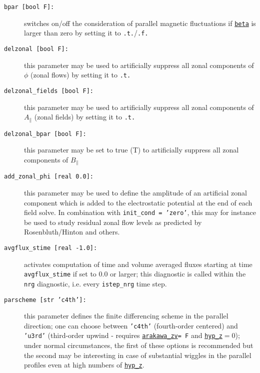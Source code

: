 \documentclass[12pt]{article}
\begin{document}
\begin{description}
\item[\hypertarget{bpar}{\tt bpar [bool F]:}] switches on/off the consideration of parallel magnetic fluctuations if
  \hyperlink{beta}{\tt beta} is larger than zero by setting it to \texttt{.t.}/\texttt{.f.}
\item[\texttt{delzonal [bool F]:}] this parameter may be used to
artificially suppress all zonal components of $\phi$ (zonal flows)
  by setting it to \texttt{.t.}
\item[\texttt{delzonal\_fields [bool F]:}] this parameter may be used to
artificially suppress all zonal components of $A_{\parallel}$ (zonal
fields) by setting it to \texttt{.t.}
\item[\texttt{delzonal\_bpar [bool F]:}] this parameter may be set to true (T) to
artificially suppress all zonal components of $B_{\parallel}$
\item[\texttt{add\_zonal\_phi [real 0.0]:}] this parameter may be used to define the amplitude
of an artificial zonal component which is added to the electrostatic potential at the end of each
field solve. In combination with {\tt init\_cond = 'zero'}, this may for instance be used to study
residual zonal flow levels as predicted by Rosenbluth/Hinton and others.
\item[\texttt{avgflux\_stime [real -1.0]:}] activates computation of time and volume averaged fluxes starting
at time \texttt{avgflux\_stime} if set to 0.0 or larger; this diagnostic is called within the \texttt{nrg}
diagnostic, i.e. every \texttt{istep\_nrg} time step.
\item[\texttt{parscheme [str 'c4th']:}] this parameter defines the finite differencing scheme in the   parallel direction; one can choose between \texttt{'c4th'} (fourth-order centered) and \texttt{'u3rd'} (third-order upwind - requires \hyperlink{arakawa_zv}{\tt arakawa\_zv}{\tt = F} and \hyperlink{hyp_z}{\tt hyp\_z}$=0$); under normal circumstances, the first of these options is recommended but the second may be interesting in case of substantial wiggles in the parallel profiles even at high numbers of \hyperlink{hyp_z}{\tt hyp\_z}.

\end{description}
\end{document}
